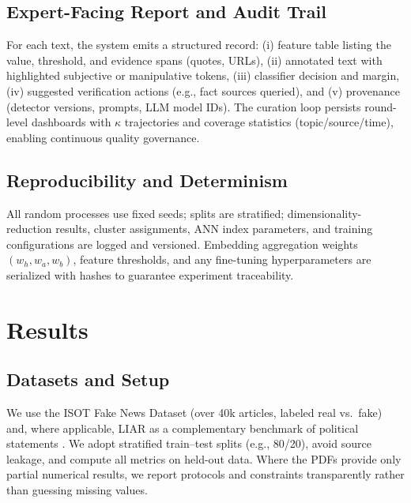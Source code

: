 \documentclass[ai,article,submit,pdftex,moreauthors]{Definitions/mdpi}
\begin{document}
\subsection{Expert-Facing Report and Audit Trail}\label{subsec:report}
For each text, the system emits a structured record: (i) feature table listing the value, threshold, and evidence spans (quotes, URLs), (ii) annotated text with highlighted subjective or manipulative tokens, (iii) classifier decision and margin, (iv) suggested verification actions (e.g., fact sources queried), and (v) provenance (detector versions, prompts, LLM model IDs). The curation loop persists round-level dashboards with $\kappa$ trajectories and coverage statistics (topic/source/time), enabling continuous quality governance.
%
%  

\subsection{Reproducibility and Determinism}\label{subsec:repro}
All random processes use fixed seeds; splits are stratified; dimensionality-reduction results, cluster assignments, ANN index parameters, and training configurations are logged and versioned. Embedding aggregation weights $(w_h,w_a,w_b)$, feature thresholds, and any fine-tuning hyperparameters are serialized with hashes to guarantee experiment traceability.


\section{Results}

\subsection{Datasets and Setup}

We use the ISOT Fake News Dataset (over 40k articles, labeled real vs.\ fake) and, where applicable, LIAR as a complementary benchmark of political statements \cite{isot,wang2017liar}. We adopt stratified train--test splits (e.g., 80/20), avoid source leakage, and compute all metrics on held-out data. Where the PDFs provide only partial numerical results, we report protocols and constraints transparently rather than guessing missing values.
\end{document}
